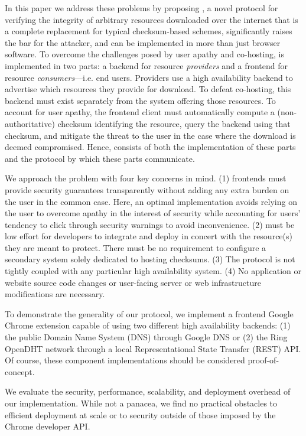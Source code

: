 In this paper we address these problems by proposing \SYSTEM{}, a novel protocol
for verifying the integrity of arbitrary resources downloaded over the internet
that is a complete replacement for typical checksum-based schemes, significantly
raises the bar for the attacker, and can be implemented in more than just
browser software. To overcome the challenges posed by user apathy and
co-hosting, \SYSTEM{} is implemented in two parts: a backend for resource
\emph{providers} and a frontend for resource \emph{consumers}---i.e. end users.
Providers use a high availability backend to advertise which resources they
provide for download. To defeat co-hosting, this backend must exist separately
from the system offering those resources. To account for user apathy, the
frontend client must automatically compute a (non-authoritative) checksum
identifying the resource, query the backend using that checksum, and mitigate
the threat to the user in the case where the download is deemed compromised.
Hence, \SYSTEM{} consists of both the implementation of these parts and the
protocol by which these parts communicate.

We approach the problem with four key concerns in mind. (1) \SYSTEM{} frontends
must provide security guarantees transparently without adding any extra burden
on the user in the common case. Here, an optimal implementation avoids relying
on the user to overcome apathy in the interest of security while accounting for
users' tendency to click through security warnings to avoid inconvenience. (2)
\SYSTEM{} must be low effort for developers to integrate and deploy in concert
with the resource(s) they are meant to protect. There must be no requirement to
configure a secondary system solely dedicated to hosting checksums. (3) The
protocol is not tightly coupled with any particular high availability system.
(4) No application or website source code changes or user-facing server or web
infrastructure modifications are necessary.

To demonstrate the generality of our protocol, we implement a frontend Google
Chrome extension capable of using two different high availability backends: (1)
the public Domain Name System (DNS) through Google DNS or (2) the Ring OpenDHT
network through a local Representational State Transfer (REST) API. Of course,
these \SYSTEM{} component implementations should be considered proof-of-concept.

We evaluate the security, performance, scalability, and deployment overhead of
our implementation. While not a panacea, we find no practical obstacles to
efficient deployment at scale or to security outside of those imposed by the
Chrome developer API.

